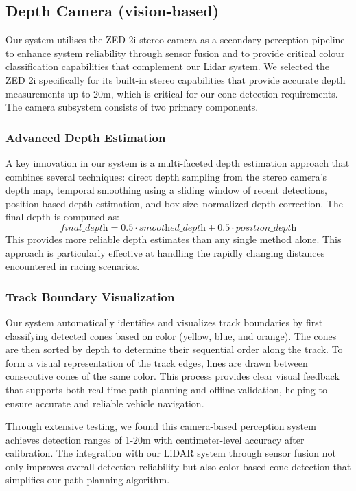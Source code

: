 \documentclass[conference]{IEEEtran}
\begin{document}
\subsection{Depth Camera (vision-based)}
Our system utilises the ZED 2i stereo camera as a secondary perception pipeline to enhance system reliability through sensor fusion and to provide critical colour classification capabilities that complement our Lidar system. We selected the ZED 2i specifically for its built-in stereo capabilities that provide accurate depth measurements up to 20m, which is critical for our cone detection requirements. The camera subsystem consists of two primary components.

\subsubsection{Advanced Depth Estimation}
A key innovation in our system is a multi-faceted depth estimation approach that combines several techniques: direct depth sampling from the stereo camera's depth map, temporal smoothing using a sliding window of recent detections, position-based depth estimation, and box-size–normalized depth correction. The final depth is computed as:
\[
\textit{final\_depth} = 0.5 \cdot \textit{smoothed\_depth} + 0.5 \cdot \textit{position\_depth}
\]
This provides more reliable depth estimates than any single method alone. This approach is particularly effective at handling the rapidly changing distances encountered in racing scenarios.

\subsubsection{Track Boundary Visualization}
Our system automatically identifies and visualizes track boundaries by first classifying detected cones based on color (yellow, blue, and orange). The cones are then sorted by depth to determine their sequential order along the track. To form a visual representation of the track edges, lines are drawn between consecutive cones of the same color. This process provides clear visual feedback that supports both real-time path planning and offline validation, helping to ensure accurate and reliable vehicle navigation.

\vspace{0.4em}
Through extensive testing, we found this camera-based perception system achieves detection ranges of 1-20m with centimeter-level accuracy after calibration. The integration with our LiDAR system through sensor fusion not only improves overall detection reliability but also color-based cone detection that simplifies our path planning algorithm.
\end{document}
